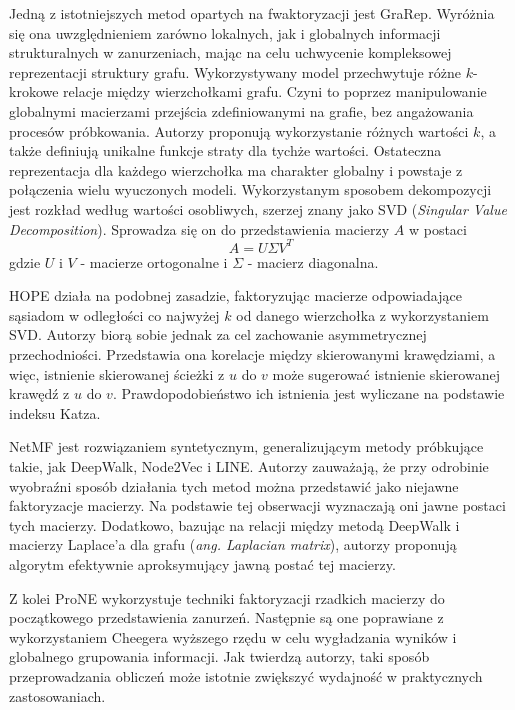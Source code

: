         Jedną z istotniejszych metod opartych na fwaktoryzacji jest GraRep\cite{Cao_Lu_Xu_2015}. Wyróżnia się ona uwzględnieniem zarówno lokalnych, jak i globalnych informacji strukturalnych w zanurzeniach, mając na celu uchwycenie kompleksowej reprezentacji struktury grafu. Wykorzystywany model przechwytuje różne $k$-krokowe relacje między wierzchołkami grafu. Czyni to poprzez manipulowanie globalnymi macierzami przejścia zdefiniowanymi na grafie, bez angażowania procesów próbkowania. Autorzy proponują wykorzystanie różnych wartości $k$, a także definiują unikalne funkcje straty dla tychże wartości. Ostateczna reprezentacja dla każdego wierzchołka ma charakter globalny i powstaje z połączenia wielu wyuczonych modeli. Wykorzystanym sposobem dekompozycji jest rozkład według wartości osobliwych, szerzej znany jako SVD (\emph{Singular Value Decomposition}). Sprowadza się on do przedstawienia macierzy $A$ w postaci 
        \[
            A = U \Sigma V^T  
        \]
        gdzie $U$ i $V$ - macierze ortogonalne i $\Sigma$ - macierz diagonalna.
         
        HOPE\cite{Ou_Cui_Pei_Zhang_Zhu_2016} działa na podobnej zasadzie, faktoryzując macierze odpowiadające sąsiadom w odległości co najwyżej $k$ od danego wierzchołka z wykorzystaniem SVD. Autorzy biorą sobie jednak za cel zachowanie asymmetrycznej przechodniości. Przedstawia ona korelacje między skierowanymi krawędziami, a więc, istnienie skierowanej ścieżki z $u$ do $v$ może sugerować istnienie skierowanej krawędź z $u$ do $v$.  Prawdopodobieństwo ich istnienia jest wyliczane na podstawie indeksu Katza\cite{Katz_1953}. 
        
        NetMF\cite{Qiu_Dong_Ma_Li_Wang_Tang_2018} jest rozwiązaniem syntetycznym, generalizującym  metody próbkujące takie, jak DeepWalk, Node2Vec i LINE. Autorzy zauważają, że przy odrobinie wyobraźni sposób działania tych metod można przedstawić jako niejawne faktoryzacje macierzy. Na podstawie tej obserwacji wyznaczają oni jawne postaci tych macierzy. Dodatkowo, bazując na relacji między metodą DeepWalk i macierzy Laplace'a dla grafu (\emph{ang. Laplacian matrix}), autorzy proponują algorytm efektywnie aproksymujący jawną postać tej macierzy.
        
        Z kolei ProNE\cite{Zhang_Dong_Wang_Tang_Ding_2019} wykorzystuje techniki faktoryzacji rzadkich macierzy do początkowego przedstawienia zanurzeń. Następnie są one poprawiane z wykorzystaniem Cheegera wyższego rzędu w celu wygładzania wyników i globalnego grupowania informacji. Jak twierdzą autorzy, taki sposób przeprowadzania obliczeń może istotnie zwiększyć wydajność w praktycznych zastosowaniach.

